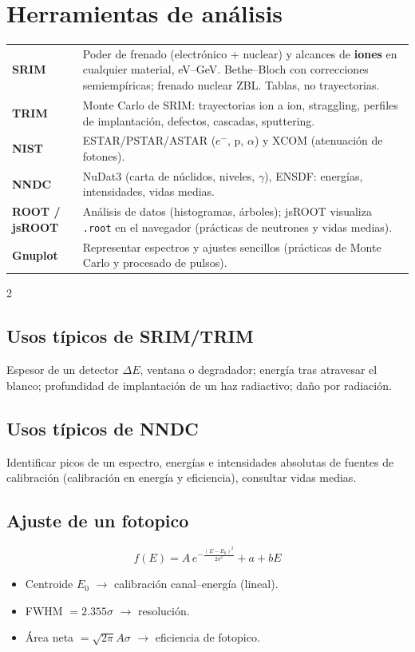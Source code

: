 \documentclass[10pt,a4paper]{article}
\begin{document}
\section{Herramientas de análisis}
\begin{clave}
\begin{tabularx}{\linewidth}{@{}lX@{}}
\textbf{SRIM} & Poder de frenado (electrónico + nuclear) y alcances de \textbf{iones} en cualquier material, eV--GeV. Bethe--Bloch con correcciones semiempíricas; frenado nuclear ZBL. Tablas, no trayectorias.\\
\textbf{TRIM} & Monte Carlo de SRIM: trayectorias ion a ion, straggling, perfiles de implantación, defectos, cascadas, sputtering.\\
\textbf{NIST} & ESTAR/PSTAR/ASTAR ($e^-$, p, $\alpha$) y XCOM (atenuación de fotones).\\
\textbf{NNDC} & NuDat3 (carta de núclidos, niveles, $\gamma$), ENSDF: energías, intensidades, vidas medias.\\
\textbf{ROOT / jsROOT} & Análisis de datos (histogramas, árboles); jsROOT visualiza \texttt{.root} en el navegador (prácticas de neutrones y vidas medias).\\
\textbf{Gnuplot} & Representar espectros y ajustes sencillos (prácticas de Monte Carlo y procesado de pulsos).\\
\end{tabularx}
\end{clave}
\begin{multicols}{2}
\subsection{Usos típicos de SRIM/TRIM}
Espesor de un detector $\Delta E$, ventana o degradador; energía tras atravesar el blanco; profundidad de implantación de un haz radiactivo; daño por radiación.
\subsection{Usos típicos de NNDC}
Identificar picos de un espectro, energías e intensidades absolutas de fuentes de calibración (calibración en energía y eficiencia), consultar vidas medias.
\columnbreak
\subsection{Ajuste de un fotopico}
\[ f(E)=A\,e^{-\frac{(E-E_0)^2}{2\sigma^2}}+a+bE \]
\begin{itemize}
\item Centroide $E_0$ $\to$ calibración canal--energía (lineal).
\item FWHM $=2.355\sigma$ $\to$ resolución.
\item Área neta $=\sqrt{2\pi}A\sigma$ $\to$ eficiencia de fotopico.
\end{itemize}
\end{multicols}
\end{document}
